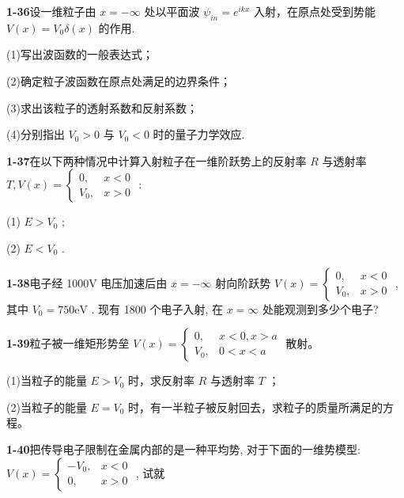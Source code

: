 \vfill

\newpage
\vfill

\noindent
\textbf{1-36}\quad 设一维粒子由 $x = -\infty$ 处以平面波 $\psi_{in} = e^{ikx}$ 入射，在原点处受到势能 $V(x) = V_0\delta (x)$ 的作用.

(1)写出波函数的一般表达式；

(2)确定粒子波函数在原点处满足的边界条件；

(3)求出该粒子的透射系数和反射系数；

(4)分别指出 $V_{0} > 0$ 与 $V_{0} <   0$ 时的量子力学效应.

\vfill

\newpage
\vfill

\noindent
\textbf{1-37}\quad 在以下两种情况中计算入射粒子在一维阶跃势上的反射率 $R$ 与透射率 $T, V(x) = \begin{cases} 0, & x < 0 \\ V_0, & x > 0 \end{cases}$ : 

(1) $E > V_0$ ; 

(2) $E < V_0$ .

\vfill

\newpage
\vfill

\noindent
\textbf{1-38}\quad 电子经 1000V 电压加速后由 $x = -\infty$ 射向阶跃势 $V(x) = \begin{cases} 0, & x < 0 \\ V_0, & x > 0 \end{cases}$ , 其中 $V_0 = 750\mathrm{eV}$ . 现有 1800 个电子入射, 在 $x = \infty$ 处能观测到多少个电子?

\vfill

\newpage
\vfill

\noindent
\textbf{1-39}\quad 粒子被一维矩形势垒 $V(x) = \begin{cases} 0, & x < 0, x > a \\ V_0, & 0 < x < a \end{cases}$ 散射。

(1)当粒子的能量 $E > V_0$ 时，求反射率 $R$ 与透射率 $T$ ；

(2)当粒子的能量 $E = V_0$ 时，有一半粒子被反射回去，求粒子的质量所满足的方程。

\vfill

\newpage
\vfill

\noindent
\textbf{1-40}\quad 把传导电子限制在金属内部的是一种平均势, 对于下面的一维势模型: $V(x) = \begin{cases} -V_0, & x < 0 \\ 0, & x > 0 \end{cases}$ , 试就


